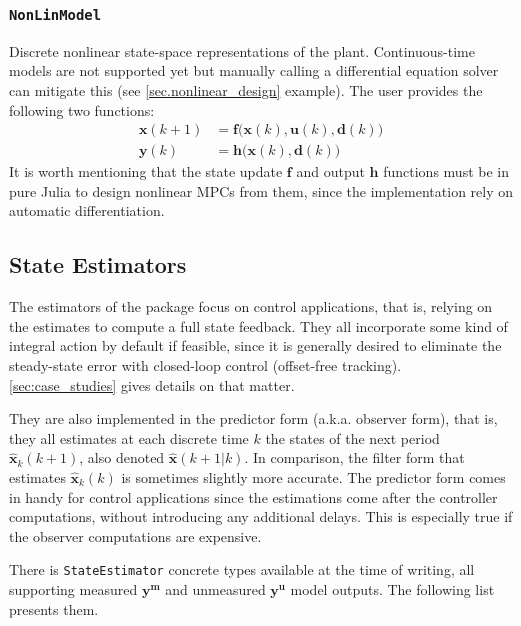 \subsubsection{\textnormal{\texttt{NonLinModel}}}

Discrete nonlinear state-space representations of the plant. Continuous-time models are not supported yet but manually calling a differential equation solver can mitigate this (see \cref{sec.nonlinear_design} example). The user provides the following two functions:
\begin{subequations}
\begin{align}
    \mathbf{x}(k+1) &= \mathbf{f}\big(\mathbf{x}(k), \mathbf{u}(k), \mathbf{d}(k)\big) \\
    \mathbf{y}(k)   &= \mathbf{h}\big( \mathbf{x}(k), \mathbf{d}(k) \big)
\end{align}
\end{subequations}
It is worth mentioning that the state update $\mathbf{f}$ and output $\mathbf{h}$ functions must be in pure Julia to design nonlinear MPCs from them, since the implementation rely on automatic differentiation.

\subsection{State Estimators}

The estimators of the package focus on control applications, that is, relying on the estimates to compute a full state feedback. They all incorporate some kind of integral action by default if feasible, since it is generally desired to eliminate the steady-state error with closed-loop control (offset-free tracking). \cref{sec:case_studies} gives details on that matter.

They are also implemented in the predictor form (a.k.a. observer form), that is, they all estimates at each discrete time $k$ the states of the next period $\mathbf{\hat{x}}_k(k+1)$, also denoted $\mathbf{\hat{x}}(k+1|k)$. In comparison, the filter form that estimates $\mathbf{\hat{x}}_k(k)$ is sometimes slightly more accurate. The predictor form comes in handy for control applications since the estimations come after the controller computations, without introducing any additional delays. This is especially true if the observer computations are expensive.

There is  \texttt{StateEstimator} concrete types available at the time of writing, all supporting measured $\mathbf{y^m}$ and unmeasured $\mathbf{y^u}$ model outputs. The following list presents them.


